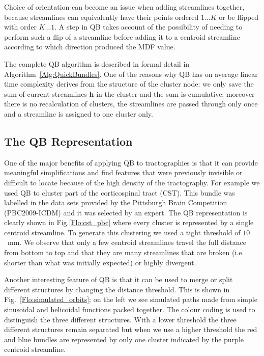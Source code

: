 \documentclass{bioinfo}
\begin{document}
\begin{methods}
Choice of orientation can become an issue when 
adding streamlines together, because 
streamlines
can equivalently have their points ordered $1 \dots K$ or be flipped with
order $K \dots 1$.
A step in QB takes account of the
possibility of needing to perform such a flip of a streamline before adding
it to a centroid streamline according to which direction produced
the MDF value.

The complete QB algorithm is described in formal detail in
Algorithm~\ref{Alg:QuickBundles}.  One of the reasons why
QB has on average linear time complexity derives from the structure of
the cluster node: we only save the sum of current streamlines
$\mathbf{h}$ in the cluster and the sum is cumulative; moreover there is
no recalculation of clusters, the streamlines are passed through only
once and a streamline is assigned to one cluster only.

\subsection{The QB Representation\label{QB_Representation}}

One of the major benefits of applying QB to tractographies is that it
can provide meaningful simplifications and find features that were
previously invisible or difficult to locate because of the high density
of the tractography. For example we used QB to cluster part of the
corticospinal tract (CST). This bundle was labelled in the data sets
provided by the Pittsburgh Brain Competition (PBC2009-ICDM) and it was
selected by an expert. The QB representation is clearly shown in
Fig.\ref{Flo:cst_pbc} where every cluster is represented by a single
centroid streamline. To generate this clustering we used a tight
threshold of $10$~mm. We observe that only a few centroid streamlines
travel the full distance from bottom to top and that they are many
streamlines that are broken (i.e. shorter than what was initially
expected) or highly divergent.

Another interesting feature of QB is that it can be used to merge or
split different structures by changing the distance threshold.  This is
shown in Fig.~\ref{Flo:simulated_orbits}; on the left we see simulated
paths made from simple sinusoidal and helicoidal functions packed
together. The colour coding is used to distinguish the three different
structures. With a lower threshold the three different structures remain
separated but when we use a higher threshold the red and blue bundles
are represented by only one cluster indicated by the purple centroid
streamline.


\end{methods}
\end{document}
